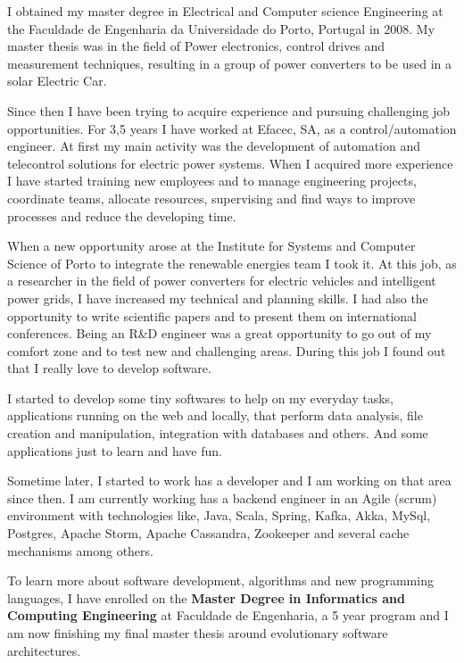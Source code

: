 \documentclass[letterpaper,11pt]{article}
\newlength{\outerbordwidth}
\newcommand{\resheading}[1]{\vspace{4pt}
  \parbox{\textwidth}{\setlength{\FrameSep}{\outerbordwidth}
    \begin{shaded}
\setlength{\fboxsep}{0pt}\framebox[\textwidth][l]{\setlength{\fboxsep}{4pt}\fcolorbox{shadecolorB}{shadecolorB}{\textbf{\sffamily{\mbox{~}\makebox[6.762in][l]{\large #1} \vphantom{p\^{E}}}}}}
    \end{shaded}
  }\vspace{4pt}
}
\newcommand{\cvevent}[1]{\vspace{5pt}
  \parbox{\textwidth}{\setlength{\FrameSep}{\outerbordwidth}
    \begin{shaded}
        \setlength{\fboxsep}{0pt}{\setlength{\fboxsep}{4pt}\fcolorbox{sectcol}{sectcol}{\textbf{\sffamily{\mbox{~}\makebox[6.762in][l]{\textcolor{white}{\large \uppercase{#1}}} \vphantom{p\^{E}}}}}}
    \end{shaded}
  }\vspace{40pt}
}
\begin{document}
\vspace{0.2in}		%


\resheading{\faUser\hspace{4pt}Summary}
\begin{center}
	\parbox{6.762in}{I obtained my master degree in Electrical and Computer science Engineering at the Faculdade de Engenharia da Universidade do Porto, Portugal in 2008. My master thesis was in the field of Power electronics, control drives and measurement techniques, resulting in a group of power converters to be used in a solar Electric Car. %
	
	Since then I have been trying to acquire experience and pursuing challenging job opportunities. For 3,5 years I have worked at Efacec, SA, as a control/automation engineer. At first my main activity was the development of automation and telecontrol solutions for electric power systems. When I acquired more experience I have started training new employees and to manage engineering projects, coordinate teams, allocate resources, supervising and find ways to improve processes and reduce the developing time.
	
	When a new opportunity arose at the Institute for Systems and Computer Science of Porto to integrate the renewable energies team I took it. At this job, as a researcher in the field of power converters for electric vehicles and intelligent power grids, I have increased my technical and planning skills. I had also the opportunity to write scientific papers and to present them on international conferences. Being an R\&D engineer was a great opportunity to go out of my comfort zone and to test new and challenging areas. During this job I found out that I really love to develop software.
	
	I started to develop some tiny softwares to help on my everyday tasks, applications running on the web and locally, that perform data analysis, file creation and manipulation, integration with databases and others. And some applications just to learn and have fun.
	
	Sometime later, I started to work has a developer and I am working on that area since then. I am currently working has a backend engineer in an Agile (scrum) environment with technologies like, Java, Scala, Spring, Kafka, Akka, MySql, Postgres, Apache Storm, Apache Cassandra, Zookeeper and several cache mechanisms among others.
	
	To learn more about software development, algorithms and new programming languages, I have enrolled on the \textbf{Master Degree in Informatics and Computing Engineering} at Faculdade de Engenharia, a 5 year program and I am now finishing my final master thesis around evolutionary software architectures.}
\end{center}
\end{document}
